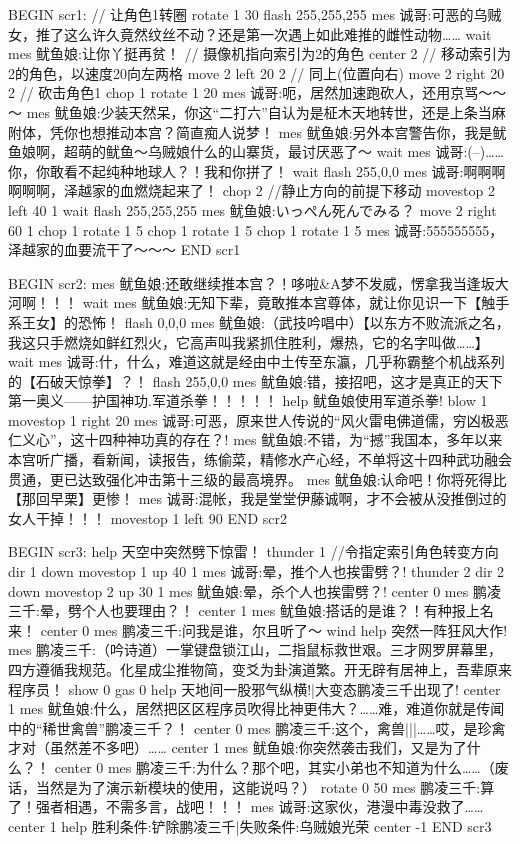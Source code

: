 BEGIN scr1:
    // 让角色1转圈
    rotate 1 30
	flash 255,255,255
	mes 诚哥:可恶的乌贼女，推了这么许久竟然纹丝不动？还是第一次遇上如此难推的雌性动物……
	wait
	mes 鱿鱼娘:让你丫挺再贫！
	// 摄像机指向索引为2的角色
    center 2
    // 移动索引为2的角色，以速度20向左两格
    move 2 left 20 2
    // 同上(位置向右)
    move 2 right 20 2
    // 砍击角色1
	chop 1
	rotate 1 20
	mes 诚哥:呃，居然加速跑砍人，还用京骂～～～
	mes 鱿鱼娘:少装天然呆，你这“二打六”自认为是柾木天地转世，还是上条当麻附体，凭你也想推动本宫？简直痴人说梦！
	mes 鱿鱼娘:另外本宫警告你，我是鱿鱼娘啊，超萌的鱿鱼～乌贼娘什么的山寨货，最讨厌恶了～
	wait
	mes 诚哥:(--)……你，你敢看不起纯种地球人？！我和你拼了！
	wait
	flash 255,0,0
	mes 诚哥:啊啊啊啊啊啊，泽越家的血燃烧起来了！
	chop 2
	//静止方向的前提下移动
	movestop 2 left 40 1
	wait
	flash 255,255,255
	mes 鱿鱼娘:いっぺん死んでみる？
	move 2 right 60 1
	chop 1
	rotate 1 5
	chop 1
	rotate 1 5
	chop 1
	rotate 1 5
	mes 诚哥:555555555，泽越家的血要流干了～～～
END scr1

BEGIN scr2:
	mes 鱿鱼娘:还敢继续推本宫？！哆啦&A梦不发威，愣拿我当逢坂大河啊！！！
	wait
	mes 鱿鱼娘:无知下辈，竟敢推本宫尊体，就让你见识一下【触手系王女】的恐怖！
	flash 0,0,0
	mes 鱿鱼娘:（武技吟唱中）【以东方不败流派之名，我这只手燃烧如鲜红烈火，它高声叫我紧抓住胜利，爆热，它的名字叫做……】
	wait
	mes 诚哥:什，什么，难道这就是经由中土传至东瀛，几乎称霸整个机战系列的【石破天惊拳】？！
	flash 255,0,0
	mes 鱿鱼娘:错，接招吧，这才是真正的天下第一奥义——护国神功.军道杀拳！！！！！
	help 鱿鱼娘使用军道杀拳!
	blow 1
	movestop 1 right 20
	mes 诚哥:可恶，原来世人传说的“风火雷电佛道儒，穷凶极恶仁义心”，这十四种神功真的存在？!
	mes 鱿鱼娘:不错，为“撼”我国本，多年以来本宫听广播，看新闻，读报告，练偷菜，精修水产心经，不单将这十四种武功融会贯通，更已达致强化冲击第十三级的最高境界。
	mes 鱿鱼娘:认命吧！你将死得比【那回早栗】更惨！
	mes 诚哥:混帐，我是堂堂伊藤诚啊，才不会被从没推倒过的女人干掉！！！
	movestop 1 left 90
END scr2

BEGIN scr3:
    help 天空中突然劈下惊雷！
    thunder 1
    //令指定索引角色转变方向
    dir 1 down
    movestop 1 up 40 1
	mes 诚哥:晕，推个人也挨雷劈？!
	thunder 2
	dir 2 down
    movestop 2 up 30 1
	mes 鱿鱼娘:晕，杀个人也挨雷劈？!
	center 0
	mes 鹏凌三千:晕，劈个人也要理由？！
	center 1
	mes 鱿鱼娘:搭话的是谁？！有种报上名来！
	center 0
	mes 鹏凌三千:问我是谁，尔且听了～
	wind 
	help 突然一阵狂风大作!
	mes 鹏凌三千:（吟诗道）一掌键盘锁江山，二指鼠标救世艰。三才网罗屏幕里，四方遵循我规范。化星成尘推物简，变爻为卦演道繁。开无辟有居神上，吾辈原来程序员！
    show 0
    gas 0
    help 天地间一股邪气纵横!|大变态鹏凌三千出现了!
    center 1
    mes 鱿鱼娘:什么，居然把区区程序员吹得比神更伟大？……难，难道你就是传闻中的“稀世禽兽”鹏凌三千？！
    center 0
    mes 鹏凌三千:这个，禽兽|||……哎，是珍禽才对（虽然差不多吧）……
    center 1
    mes 鱿鱼娘:你突然袭击我们，又是为了什么？！
    center 0
    mes 鹏凌三千:为什么？那个吧，其实小弟也不知道为什么……（废话，当然是为了演示新模块的使用，这能说吗？）
    rotate 0 50
    mes 鹏凌三千:算了！强者相遇，不需多言，战吧！！！
    mes 诚哥:这家伙，港漫中毒没救了……
    center 1
    help 胜利条件:铲除鹏凌三千|失败条件:乌贼娘光荣
    center -1
END scr3

